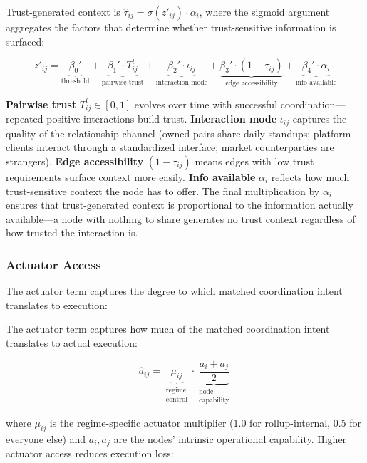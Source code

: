 \documentclass[12pt]{article}
\theoremstyle{definition}
\begin{document}
Trust-generated context is $\hat{\tau}_{ij} = \sigma(z'_{ij}) \cdot \alpha_i$, where the sigmoid argument aggregates the factors that determine whether trust-sensitive information is surfaced:

\begin{equation}
\label{eq:trust}
z'_{ij} = \underbrace{\beta_0'}_{\text{threshold}} + \underbrace{\beta_1' \cdot T_{ij}^t}_{\text{pairwise trust}} + \underbrace{\beta_2' \cdot \iota_{ij}}_{\text{interaction mode}} + \underbrace{\beta_3' \cdot (1 - \tau_{ij})}_{\text{edge accessibility}} + \underbrace{\beta_4' \cdot \alpha_i}_{\text{info available}}
\end{equation}

\noindent \textbf{Pairwise trust} $T_{ij}^t \in [0,1]$ evolves over time with successful coordination---repeated positive interactions build trust. \textbf{Interaction mode} $\iota_{ij}$ captures the quality of the relationship channel (owned pairs share daily standups; platform clients interact through a standardized interface; market counterparties are strangers). \textbf{Edge accessibility} $(1 - \tau_{ij})$ means edges with low trust requirements surface context more easily. \textbf{Info available} $\alpha_i$ reflects how much trust-sensitive context the node has to offer. The final multiplication by $\alpha_i$ ensures that trust-generated context is proportional to the information actually available---a node with nothing to share generates no trust context regardless of how trusted the interaction is.

\subsubsection{Actuator Access}
\label{sec:actuator}

The actuator term captures the degree to which matched coordination intent translates to execution:

The actuator term captures how much of the matched coordination intent translates to actual execution:

\begin{equation}
\hat{a}_{ij} = \underbrace{\mu_{ij}}_{\substack{\text{regime} \\ \text{control}}} \cdot \underbrace{\frac{a_i + a_j}{2}}_{\substack{\text{node} \\ \text{capability}}}
\end{equation}

\noindent where $\mu_{ij}$ is the regime-specific actuator multiplier (1.0 for rollup-internal, 0.5 for everyone else) and $a_i, a_j$ are the nodes' intrinsic operational capability. Higher actuator access reduces execution loss:
\end{document}
